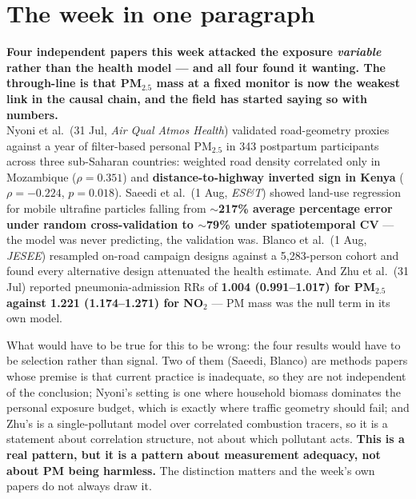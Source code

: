 \documentclass[10pt]{article}
\begin{document}
\vspace{6mm}

\section*{\sffamily\bfseries\color{Deep}The week in one paragraph}
\vspace{-1.5mm}{\color{Teal}\rule{\linewidth}{1.1pt}}\vspace{2.5mm}

\begin{keybox}
{\sffamily\bfseries\small\color{Deep}Four independent papers this week attacked the
exposure \emph{variable} rather than the health model --- and all four found it
wanting. The through-line is that PM$_{2.5}$ mass at a fixed monitor is now the
weakest link in the causal chain, and the field has started saying so with
numbers.}\\[1.4mm]
\footnotesize
Nyoni et al.\ (31 Jul, \textit{Air Qual Atmos Health}) validated road-geometry proxies
against a year of filter-based personal PM$_{2.5}$ in 343 postpartum participants across
three sub-Saharan countries: weighted road density correlated only in Mozambique
($\rho = 0.351$) and \textbf{distance-to-highway inverted sign in Kenya}
($\rho = -0.224$, $p = 0.018$). Saeedi et al.\ (1 Aug, \textit{ES\&T}) showed
land-use regression for mobile ultrafine particles falling from
\textbf{$\sim$217\% average percentage error under random cross-validation to
$\sim$79\% under spatiotemporal CV} --- the model was never predicting, the validation
was. Blanco et al.\ (1 Aug, \textit{JESEE}) resampled on-road campaign designs against a
5{,}283-person cohort and found every alternative design attenuated the health estimate.
And Zhu et al.\ (31 Jul) reported pneumonia-admission RRs of \textbf{1.004
(0.991--1.017) for PM$_{2.5}$ against 1.221 (1.174--1.271) for NO$_2$} --- PM mass was
the null term in its own model.

What would have to be true for this to be wrong: the four results would have to be
selection rather than signal. Two of them (Saeedi, Blanco) are methods papers whose
premise is that current practice is inadequate, so they are not independent of the
conclusion; Nyoni's setting is one where household biomass dominates the personal
exposure budget, which is exactly where traffic geometry should fail; and Zhu's is a
single-pollutant model over correlated combustion tracers, so it is a statement about
correlation structure, not about which pollutant acts. \textbf{This is a real pattern,
but it is a pattern about measurement adequacy, not about PM being harmless.} The
distinction matters and the week's own papers do not always draw it.
\end{keybox}
\end{document}

